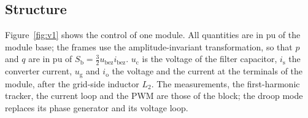 \documentclass[11pt,a4paper]{scrartcl}
\newcommand{\ped}[1]{_{\mathrm{#1}}}
\begin{document}
\begin{onehalfspace}
\subsection{Structure}

Figure~\ref{fig:v1} shows the control of one module. All quantities are in pu of the module base; the frames use the amplitude-invariant transformation, so that $p$ and $q$ are in pu of $S\ped{b} = \tfrac32 u\ped{bez} i\ped{bez}$. $u\ped{c}$ is the voltage of the filter capacitor, $i\ped{s}$ the converter current, $u\ped{g}$ and $i\ped{o}$ the voltage and the current at the terminals of the module, after the grid-side inductor $L_2$. The measurements, the first-harmonic tracker, the current loop and the PWM are those of the block; the droop mode replaces its phase generator and its voltage loop.


\end{onehalfspace}
\end{document}
